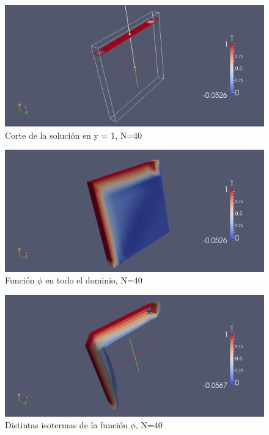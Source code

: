 \documentclass[11pt]{article}
\begin{document}
\begin{figure}[tbh]
	\centering
		\includegraphics[width=1.0\textwidth]{imagen35.png}
	\caption{Corte de la soluci\'on en y = 1, N=40}
	\label{fig:Fig1}
\end{figure}

\begin{figure}[tbh]
	\centering
		\includegraphics[width=1.0\textwidth]{imagen36.png}
	\caption{Funci\'on $\phi$ en todo el dominio, N=40}
	\label{fig:Fig1}
\end{figure}

\begin{figure}[tbh]
	\centering
		\includegraphics[width=1.0\textwidth]{imagen37.png}
	\caption{Distintas isotermas de la funci\'on $\phi$, N=40}
	\label{fig:Fig1}
\end{figure}
\end{document}
